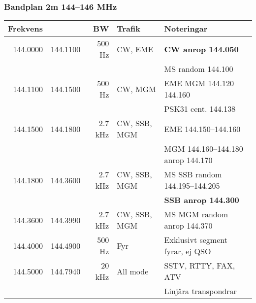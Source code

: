 \begin{landscape}
\subsubsection{Bandplan 2m 144--146 MHz}
\begin{tabular}{rrrll}
\textbf{Frekvens}         &               & \textbf{BW}   & \textbf{Trafik}     & \textbf{Noteringar}                                          \\ \hline
	         144.0000         & 144.1100      & 500 Hz        & CW, EME             & \textbf{CW anrop 144.050}                                    \\
                                  &               &               &                     & MS random 144.100                                            \\ \hline
	         144.1100         & 144.1500      & 500 Hz        & CW, MGM             & EME MGM 144.120--144.160                                     \\
                                  &               &               &                     & PSK31 cent. 144.138                                          \\ \hline
	         144.1500         & 144.1800      & 2.7 kHz       & CW, SSB, MGM        & EME 144.150--144.160                                         \\
                                  &               &               &                     & MGM 144.160--144.180 anrop 144.170                           \\ \hline
	         144.1800         & 144.3600      & 2.7 kHz       & CW, SSB, MGM        & MS SSB random 144.195--144.205                               \\
                                  &               &               &                     & \textbf{SSB anrop 144.300}                                   \\ \hline
	         144.3600         & 144.3990      & 2.7 kHz       & CW, SSB, MGM        & MS MGM random anrop 144.370                                  \\ \hline
	         144.4000         & 144.4900      & 500 Hz        & Fyr                 & Exklusivt segment fyrar, ej QSO                              \\ \hline
	         144.5000         & 144.7940      & 20 kHz        & All mode            & SSTV, RTTY, FAX, ATV                                         \\
                                  &               &               &                     & Linjära transpondrar                                         \\ \hline

\end{tabular}
\end{landscape}
